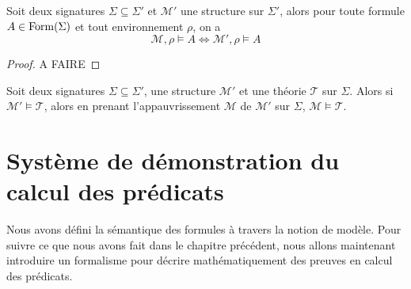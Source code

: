\begin{proposition}
  Soit deux signatures $\Sigma\subseteq\Sigma'$ et $\mathcal M'$ une structure
  sur $\Sigma'$, alors pour toute formule $A\in\operatorname{Form}(\Sigma)$ et tout
  environnement $\rho$, on a
  \[\mathcal M,\rho\models A \iff \mathcal M',\rho\models A\]
\end{proposition}

\begin{proof}
  A FAIRE
\end{proof}

\begin{corollary}
  Soit deux signatures $\Sigma\subseteq\Sigma'$, une structure $\mathcal M'$
  et une théorie $\mathcal T$ sur $\Sigma$. Alors si
  $\mathcal M'\models \mathcal T$, alors en prenant l'appauvrissement
  $\mathcal M$ de $\mathcal M'$ sur $\Sigma$, $\mathcal M\models \mathcal T$.
\end{corollary}

\section[Syntaxe de preuves]{Système de démonstration du calcul des prédicats}

Nous avons défini la sémantique des formules à travers la notion de modèle. Pour
suivre ce que nous avons fait dans le chapitre précédent, nous allons maintenant
introduire un formalisme pour décrire mathématiquement des preuves en calcul des
prédicats.

